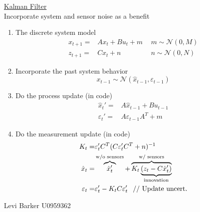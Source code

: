 \documentclass[twocolumn]{article}    %
\begin{document}
    \noindent
    \underline{Kalman Filter}\\
    Incorporate system and sensor noise as a benefit    
    \begin{enumerate}
        \item The discrete system model 
        \begin{align*}
            x_{t+1} =& Ax_t + Bu_t + m \hspace{5pt} &m \sim \mathcal{N}(0,M)\\
            z_{t+1} =& Cx_t + n          & n \sim  \mathcal{N}(0,N)
        \end{align*}
        
        \item Incorporate the past system behavior
        \begin{equation*}
            x_{t-1}  \sim \mathcal{N}(\hat{x}_{t-1}, \varepsilon_{t-1})
        \end{equation*}
        
        \item Do the process update (in code)
        \begin{align*}
            \hat{x}_t' =& A\hat{x}_{t-1} + Bu_{t-1}\\
            \varepsilon_t' =& A\varepsilon_{t-1}A^T + m
        \end{align*}
        
        \item Do the measurement update (in code)
        \begin{align*}
            K_t =& \varepsilon_t' C^T (C\varepsilon_t' C^T+ n)^{-1}\\
            \hat{x}_t =& \overbrace{\hat{x}_t'}^{\text{w/o sensors}} + \overbrace{K_t \underbrace{(z_t-C\hat{x}_t')}_{\text{innovation}} }^{\text{w/ sensors}}\\
            \varepsilon_t =& \varepsilon_t' - K_t C \varepsilon_t' \hspace{7.5pt} \text{// Update uncert.}
        \end{align*}
    \end{enumerate}
    \vspace{20pt}
    \begin{center}
        Levi Barker \hspace{35pt} U0959362
    \end{center}
\end{document}
